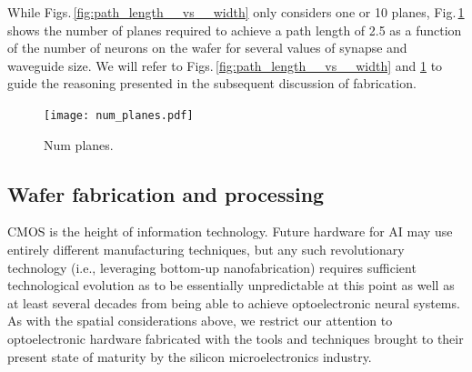 \documentclass[twocolumn]{article}
\begin{document}
While Figs.\,\ref{fig:path_length__vs__width} only considers one or 10 planes, Fig.\,\ref{fig:num_planes} shows the number of planes required to achieve a path length of 2.5 as a function of the number of neurons on the wafer for several values of synapse and waveguide size. We will refer to Figs.\,\ref{fig:path_length__vs__width} and \ref{fig:num_planes} to guide the reasoning presented in the subsequent discussion of fabrication.
\begin{figure}
    \centering
    \texttt{[image: num\_planes.pdf]} 
    \caption{Num planes.}
    \label{fig:num_planes}
\end{figure}

\subsection{Wafer fabrication and processing}
\label{sec:fabrication}
CMOS is the height of information technology. Future hardware for AI may use entirely different manufacturing techniques, but any such revolutionary technology (i.e., leveraging bottom-up nanofabrication) requires sufficient technological evolution as to be essentially unpredictable at this point as well as at least several decades from being able to achieve optoelectronic neural systems. As with the spatial considerations above, we restrict our attention to optoelectronic hardware fabricated with the tools and techniques brought to their present state of maturity by the silicon microelectronics industry. 
\end{document}
